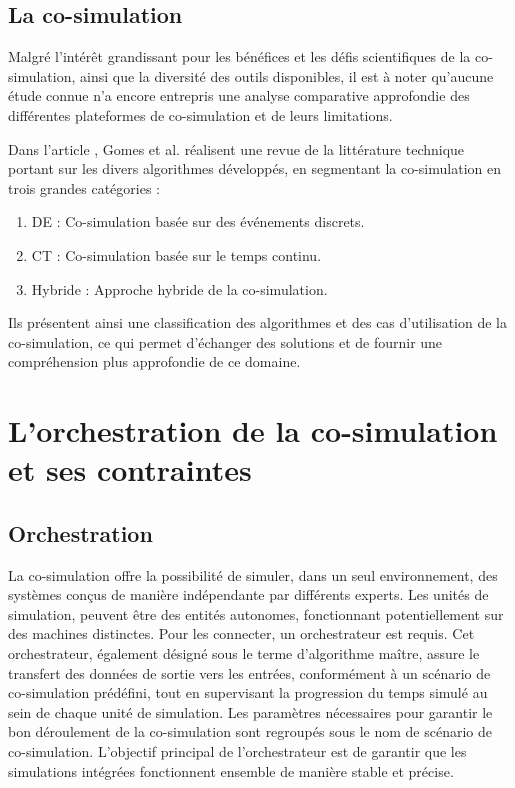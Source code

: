 \subsection{La co-simulation }
Malgré l'intérêt grandissant pour les bénéfices et les défis scientifiques de la co-simulation, ainsi que la diversité des outils disponibles, il est à noter qu'aucune étude connue n'a encore entrepris une analyse comparative approfondie des différentes plateformes de co-simulation et de leurs limitations.

Dans l'article \cite{b7}, Gomes et al. réalisent une revue de la littérature technique portant sur les divers algorithmes développés, en segmentant la co-simulation en trois grandes catégories :
\begin{enumerate}
  \item DE : Co-simulation basée sur des événements discrets.
  \item CT : Co-simulation basée sur le temps continu.
  \item Hybride : Approche hybride de la co-simulation.
\end{enumerate}

Ils présentent ainsi une classification des algorithmes et des cas d'utilisation de la co-simulation, ce qui permet d'échanger des solutions et de fournir une compréhension plus approfondie de ce domaine. 

\section{L'orchestration de la co-simulation et ses contraintes}\label{sec:3}
\subsection{Orchestration}
La co-simulation offre la possibilité de simuler, dans un seul environnement, des systèmes conçus de manière indépendante par différents experts. Les unités de simulation, peuvent être des entités autonomes, fonctionnant potentiellement sur des machines distinctes. Pour les connecter, un orchestrateur est requis. Cet orchestrateur, également désigné sous le terme d'algorithme maître, assure le transfert des données de sortie vers les entrées, conformément à un scénario de co-simulation prédéfini, tout en supervisant la progression du temps simulé au sein de chaque unité de simulation. Les paramètres nécessaires pour garantir le bon déroulement de la co-simulation sont regroupés sous le nom de scénario de co-simulation. L'objectif principal de l'orchestrateur est de garantir que les simulations intégrées fonctionnent ensemble de manière stable et précise.

